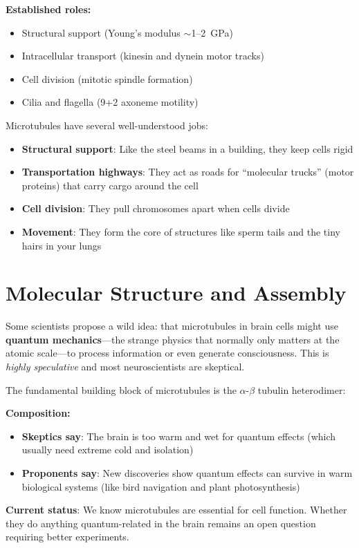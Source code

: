 \textbf{Established roles:}
\begin{itemize}
\item Structural support (Young's modulus $\sim$1--2~GPa)
\item Intracellular transport (kinesin and dynein motor tracks)
\item Cell division (mitotic spindle formation)
\item Cilia and flagella (9+2 axoneme motility)
\end{itemize}

Microtubules have several well-understood jobs:
\begin{itemize}
\item \textbf{Structural support}: Like the steel beams in a building, they keep cells rigid
\item \textbf{Transportation highways}: They act as roads for ``molecular trucks'' (motor proteins) that carry cargo around the cell
\item \textbf{Cell division}: They pull chromosomes apart when cells divide
\item \textbf{Movement}: They form the core of structures like sperm tails and the tiny hairs in your lungs
\end{itemize}

\section{Molecular Structure and Assembly}

Some scientists propose a wild idea: that microtubules in brain cells might use \textbf{quantum mechanics}---the strange physics that normally only matters at the atomic scale---to process information or even generate consciousness. This is \emph{highly speculative} and most neuroscientists are skeptical.

The fundamental building block of microtubules is the $\alpha$-$\beta$ tubulin heterodimer:

\textbf{Composition:}
\begin{itemize}
\item \textbf{Skeptics say}: The brain is too warm and wet for quantum effects (which usually need extreme cold and isolation)
\item \textbf{Proponents say}: New discoveries show quantum effects can survive in warm biological systems (like bird navigation and plant photosynthesis)
\end{itemize}

\textbf{Current status}: We know microtubules are essential for cell function. Whether they do anything quantum-related in the brain remains an open question requiring better experiments.

